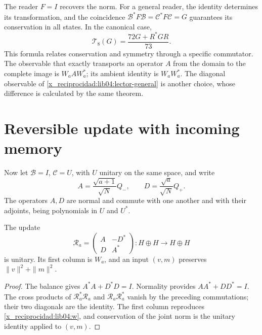 The reader \(F=I\) recovers the norm. For a general reader, the
identity determines its transformation, and the coincidence
\(\mathcal B^*F\mathcal B=\mathcal C^*F\mathcal C=G\) guarantees
its conservation in all states. In the canonical case,
\begin{equation}
 \mathcal T_8(G)=\frac{72G+R^*GR}{73}.
 \label{x_reciprocidad:lib04:lector-72}
\end{equation}
This formula relates conservation and symmetry through a specific
commutator. The observable that exactly transports an operator
\(A\) from the domain to the complete image is \(W_aAW_a^*\); its
ambient identity is \(W_aW_a^*\). The diagonal observable of
\eqref{x_reciprocidad:lib04:lector-general} is another choice, whose difference is
calculated by the same theorem.

\section{Reversible update with incoming memory}
\label{x_reciprocidad:lib04:reentrada}

Now let \(\mathcal B=I\), \(\mathcal C=U\), with \(U\)
unitary on the same space, and write
\begin{equation}
 A=\frac{\sqrt{a+1}}{\sqrt N}Q_-,\qquad
 D=\frac{\sqrt a}{\sqrt N}Q_+.
 \label{x_reciprocidad:lib04:ad}
\end{equation}
The operators \(A,D\) are normal and commute with one another and with their
adjoints, being polynomials in \(U\) and \(U^*\).

\begin{theorem}
\label{x_reciprocidad:lib04:teo-unitaria}
The update
\begin{equation}
 \mathscr R_a=
 \begin{pmatrix}A&-D^*\\D&A^*\end{pmatrix}:H\oplus H\to H\oplus H
 \label{x_reciprocidad:lib04:unitaria}
\end{equation}
is unitary. Its first column is \(W_a\), and an input
\((v,m)\) preserves \(\|v\|^2+\|m\|^2\).
\end{theorem}

\begin{proof}
The balance gives \(A^*A+D^*D=I\). Normality provides
\(AA^*+DD^*=I\). The cross products of
\(\mathscr R_a^*\mathscr R_a\) and
\(\mathscr R_a\mathscr R_a^*\) vanish by the preceding
commutations; their two diagonals are the identity. The first column
reproduces \eqref{x_reciprocidad:lib04:w}, and conservation of the joint norm
is the unitary identity applied to \((v,m)\).
\end{proof}

